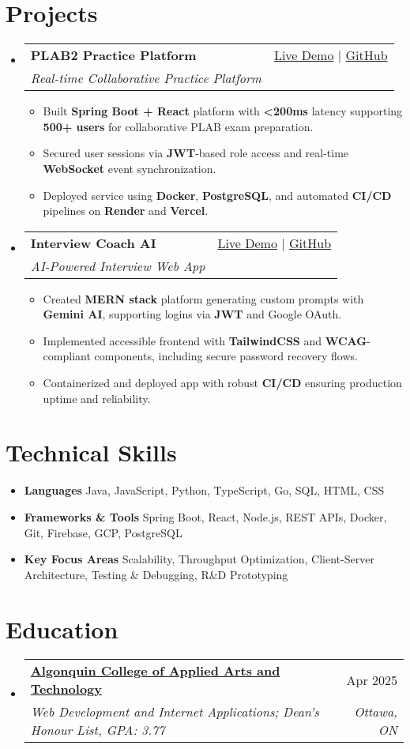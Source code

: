 \documentclass[letterpaper,11pt]{article}
\makeatletter
\newcommand{\resumeItem}[1]{\item\small{#1 \vspace{-2pt}}}
\newcommand{\resumeSubheading}[4]{
  \vspace{-1pt}\item
    \begin{tabular*}{0.97\textwidth}[t]{l@{\extracolsep{\fill}}r}
      \textbf{#1} & #2 \\
      \textit{\small#3} & \textit{\small #4} \\
    \end{tabular*}\vspace{-5pt}
}
\newcommand{\resumeSubHeadingListStart}{\begin{itemize}[leftmargin=*]}
\newcommand{\resumeSubHeadingListEnd}{\end{itemize}}
\newcommand{\resumeItemListStart}{\begin{itemize}}
\newcommand{\resumeItemListEnd}{\end{itemize}\vspace{-5pt}}
\makeatother
\begin{document}
\section{Projects}
  \resumeSubHeadingListStart
    \resumeSubheading
      {\textbf{PLAB2 Practice Platform}}{\href{https://plab2practice.com}{Live Demo} | \href{https://github.com/altansaid/plab2projectnew}{GitHub}}
      {Real-time Collaborative Practice Platform}{}
      \resumeItemListStart
        \resumeItem{Built \textbf{Spring Boot + React} platform with \textbf{<200ms} latency supporting \textbf{500+ users} for collaborative PLAB exam preparation.}
        \resumeItem{Secured user sessions via \textbf{JWT}-based role access and real-time \textbf{WebSocket} event synchronization.}
        \resumeItem{Deployed service using \textbf{Docker}, \textbf{PostgreSQL}, and automated \textbf{CI/CD} pipelines on \textbf{Render} and \textbf{Vercel}.}
      \resumeItemListEnd

    \resumeSubheading
      {\textbf{Interview Coach AI}}{\href{https://interviewcoach-ai.vercel.app/}{Live Demo} | \href{https://github.com/altansaid/interviewcoach-ai}{GitHub}}
      {AI-Powered Interview Web App}{}
      \resumeItemListStart
        \resumeItem{Created \textbf{MERN stack} platform generating custom prompts with \textbf{Gemini AI}, supporting logins via \textbf{JWT} and Google OAuth.}
        \resumeItem{Implemented accessible frontend with \textbf{TailwindCSS} and \textbf{WCAG}-compliant components, including secure password recovery flows.}
        \resumeItem{Containerized and deployed app with robust \textbf{CI/CD} ensuring production uptime and reliability.}
      \resumeItemListEnd
  \resumeSubHeadingListEnd

\section{Technical Skills}
  \resumeItemListStart
    \resumeItem{\textbf{Languages}}{Java, JavaScript, Python, TypeScript, Go, SQL, HTML, CSS}
    \resumeItem{\textbf{Frameworks \& Tools}}{Spring Boot, React, Node.js, REST APIs, Docker, Git, Firebase, GCP, PostgreSQL}
    \resumeItem{\textbf{Key Focus Areas}}{Scalability, Throughput Optimization, Client-Server Architecture, Testing \& Debugging, R\&D Prototyping}
  \resumeItemListEnd

\section{Education}
  \resumeSubHeadingListStart
    \resumeSubheading
      {\href{https://www.algonquincollege.com/sat/program/web-development-internet-applications/}{Algonquin College of Applied Arts and Technology}}{Apr 2025}
      {Web Development and Internet Applications; Dean's Honour List, GPA: 3.77}{Ottawa, ON}
  \resumeSubHeadingListEnd
\end{document}
